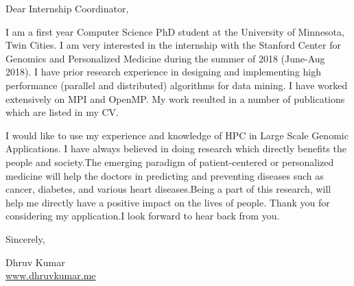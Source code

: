 \documentclass{letter}
\begin{document}
\address{University of Minnesota \\ 4-192 Keller Hall \\ 200 Union St. SE \\ Minneapolis, MN 55455}
\signature{Dhruv Kumar}

\begin{letter}{}
\opening{Dear Internship Coordinator,}

I am a first year Computer Science PhD student at the University of Minnesota, Twin Cities. I am very interested in the
internship with the Stanford Center for Genomics and Personalized Medicine during the summer of 2018 (June-Aug 2018).
I have prior research experience in designing and implementing high performance (parallel and distributed) algorithms for
data mining. I have worked extensively on MPI and OpenMP. My work resulted in a number of publications which are listed in my CV.

I would like to use my experience and knowledge of HPC in Large Scale Genomic Applications.
I have always believed in doing research which directly benefits the people and society.The emerging paradigm of
patient-centered or personalized medicine will help the doctors in predicting and preventing diseases such as cancer, diabetes,
and various heart diseases.Being a part of this research, will help me directly have a positive impact on the lives of people.
Thank you for considering my application.I look forward to hear back from you.

Sincerely,

Dhruv Kumar\\
  \href{http://www.dhruvkumar.me}{www.dhruvkumar.me}
\end{letter}
\end{document}
